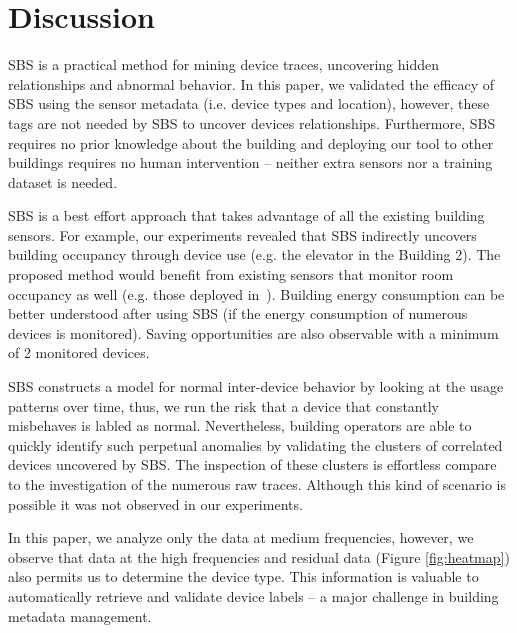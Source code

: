 \section{Discussion}
SBS is a practical method for mining device traces, uncovering hidden relationships and abnormal behavior. 
In this paper, we validated the efficacy of SBS using the sensor metadata (i.e. device types and location), however, these 
tags are not needed by SBS to uncover devices relationships.
Furthermore, SBS requires no prior knowledge about the building and deploying our tool to other buildings requires no human intervention --
neither extra sensors nor a training dataset is needed. 

SBS is a best effort approach that takes advantage of all the existing building sensors.
For example, our experiments revealed that SBS indirectly uncovers building occupancy through device use (e.g. the elevator in the Building 2). 
The proposed method would benefit from existing sensors that monitor room occupancy as well (e.g. those deployed in~\cite{agarwal:ipsn2011,erickson:ipsn2011}).  %
Building energy consumption can be better understood after using SBS (if the energy consumption of numerous devices is monitored).  
Saving opportunities are also observable with a minimum of 2 monitored devices.

SBS constructs a model for normal inter-device behavior by looking at the usage patterns over time, thus, we run the risk that
a device that constantly misbehaves is labled as normal.  %
Nevertheless, building operators are able to quickly identify such perpetual anomalies by validating the clusters of correlated devices uncovered by SBS.
The inspection of these clusters is effortless compare to the investigation of the numerous raw traces.  
Although this kind of scenario is possible it was not observed in our experiments.

In this paper, we analyze only the data at medium frequencies, however, we observe that data at the high frequencies and residual data (Figure \ref{fig:heatmap}) also permits us to determine the device type.  %
This information is valuable to automatically retrieve and validate device labels -- a major challenge in building metadata
management.

